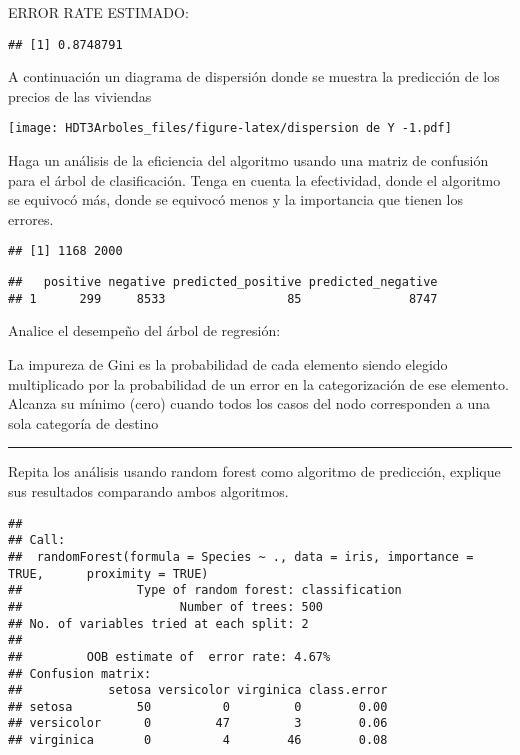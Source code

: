 \documentclass[
]{article}
\begin{document}
ERROR RATE ESTIMADO:

\begin{verbatim}
## [1] 0.8748791
\end{verbatim}

A continuación un diagrama de dispersión donde se muestra la predicción
de los precios de las viviendas

\texttt{[image: HDT3Arboles\_files/figure-latex/dispersion de Y -1.pdf]}

Haga un análisis de la eficiencia del algoritmo usando una matriz de
confusión para el árbol de clasificación. Tenga en cuenta la
efectividad, donde el algoritmo se equivocó más, donde se equivocó menos
y la importancia que tienen los errores.

\begin{verbatim}
## [1] 1168 2000
\end{verbatim}

\begin{verbatim}
##   positive negative predicted_positive predicted_negative
## 1      299     8533                 85               8747
\end{verbatim}

Analice el desempeño del árbol de regresión:

La impureza de Gini es la probabilidad de cada elemento siendo elegido
multiplicado por la probabilidad de un error en la categorización de ese
elemento. Alcanza su mínimo (cero) cuando todos los casos del nodo
corresponden a una sola categoría de destino

\begin{center}\rule{0.5\linewidth}{0.5pt}\end{center}

Repita los análisis usando random forest como algoritmo de predicción,
explique sus resultados comparando ambos algoritmos.

\begin{verbatim}
## 
## Call:
##  randomForest(formula = Species ~ ., data = iris, importance = TRUE,      proximity = TRUE) 
##                Type of random forest: classification
##                      Number of trees: 500
## No. of variables tried at each split: 2
## 
##         OOB estimate of  error rate: 4.67%
## Confusion matrix:
##            setosa versicolor virginica class.error
## setosa         50          0         0        0.00
## versicolor      0         47         3        0.06
## virginica       0          4        46        0.08
\end{verbatim}
\end{document}
